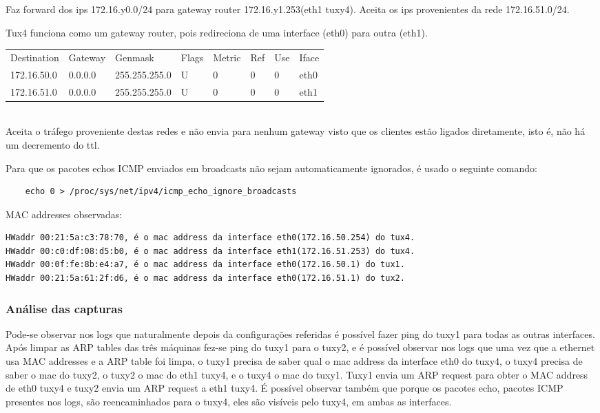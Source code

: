 \documentclass[a4paper]{article}
\begin{document}
Faz forward dos ips 172.16.y0.0/24 para gateway router 172.16.y1.253(eth1 tuxy4). Aceita os ips provenientes da rede 172.16.51.0/24. 

Tux4 funciona como um gateway router, pois redireciona de uma interface (eth0) para outra (eth1).

\begin{tabular}{l l l l l l l l}
Destination & Gateway & Genmask & Flags & Metric & Ref & Use & Iface \\
172.16.50.0 & 0.0.0.0 & 255.255.255.0 & U & 0 & 0 & 0 & eth0 \\
172.16.51.0 & 0.0.0.0 & 255.255.255.0 & U & 0 & 0 & 0 & eth1
\end{tabular} \\

Aceita o tráfego proveniente destas redes e não envia para nenhum gateway visto que os clientes
estão ligados diretamente, isto é, não há um decremento do ttl.

Para que os pacotes echos ICMP enviados em broadcasts não sejam automaticamente ignorados, é usado o seguinte comando:
\begin{verbatim}
	echo 0 > /proc/sys/net/ipv4/icmp_echo_ignore_broadcasts
\end{verbatim}

MAC addresses observadas:
\begin{verbatim}
HWaddr 00:21:5a:c3:78:70, é o mac address da interface eth0(172.16.50.254) do tux4.
HWaddr 00:c0:df:08:d5:b0, é o mac address da interface eth1(172.16.51.253) do tux4.
HWaddr 00:0f:fe:8b:e4:a7, é o mac address da interface eth0(172.16.50.1) do tux1.
HWaddr 00:21:5a:61:2f:d6, é o mac address da interface eth0(172.16.51.1) do tux2.
\end{verbatim}

\subsubsection{Análise das capturas}
Pode-se observar nos logs que naturalmente depois da configurações referidas é possível fazer ping do tuxy1 para todas as outras interfaces.
Após limpar as ARP tables das três máquinas fez-se ping do tuxy1 para o tuxy2, e é possível observar nos logs que uma vez que a ethernet usa MAC addresses e a ARP table foi limpa, o tuxy1 precisa de saber qual o mac address da interface eth0 do tuxy4, o tuxy4 precisa de saber o mac do tuxy2, o tuxy2 o mac do eth1 tuxy4, e o tuxy4 o mac do tuxy1. Tuxy1 envia um ARP request para obter o MAC address de eth0 tuxy4 e tuxy2 envia um ARP request a eth1 tuxy4. 
É possível observar também que porque os pacotes echo, pacotes ICMP presentes nos logs, são reencaminhados para o tuxy4, eles são visíveis pelo tuxy4, em ambas as interfaces.
\end{document}
